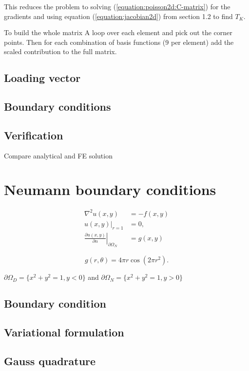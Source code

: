 \documentclass[paper=a4, fontsize=11pt]{scrartcl} %
\begin{document}
This reduces the problem to solving (\ref{equation:poisson2d:C-matrix}) for the gradients and using equation (\ref{equation:jacobian2d}) from section 1.2 to find $T_K$.

To build the whole matrix A loop over each element and pick out the corner points. Then for each combination of basis functions (9 per element) add the scaled contribution to the full matrix.

\subsection{Loading vector}


\subsection{Boundary conditions}
\subsection{Verification}
Compare analytical and FE solution

\section{Neumann boundary conditions}
\begin{equation}
\begin{aligned}
\nabla^2u(x,y) 	&= -f(x,y) \\
u(x,y)|_{r=1} 	&= 0, \\
\left. \frac{\partial u(x,y)}{\partial n}\right|_{\partial\Omega_N} &= g(x,y)
\end{aligned}
\label{equation:poisson2d:Neu:problem}
\end{equation}

\begin{equation}
g(r,\theta) =4\pi r\cos(2\pi r^2).
\label{equation:poisson2d:Neu:condition}
\end{equation}

$\partial\Omega_D = \{x^2+y^2=1,y<0\}$ and $\partial\Omega_N = \{x^2+y^2=1,y>0\}$

\subsection{Boundary condition}
\subsection{Variational formulation}
\subsection{Gauss quadrature}
\end{document}
